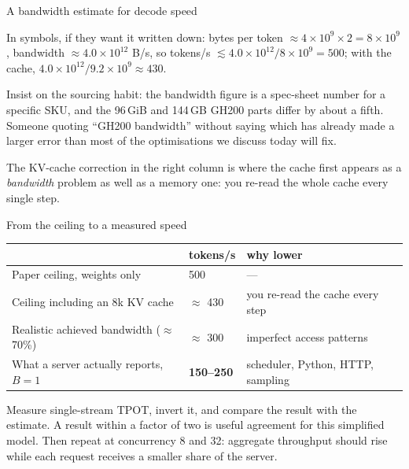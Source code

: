 \documentclass[aspectratio=169,10pt]{beamer}
\begin{document}
\begin{frame}{A bandwidth estimate for decode speed}
{  In symbols, if they want it written down: bytes per token
  $\approx 4\times10^{9}\times 2 = 8\times10^{9}$, bandwidth
  $\approx 4.0\times10^{12}$ B/s, so tokens/s
  $\lesssim 4.0\times10^{12}/8\times10^{9} = 500$; with the cache,
  $4.0\times10^{12}/9.2\times10^{9} \approx 430$.

  Insist on the sourcing habit: the bandwidth figure is a spec-sheet number for
  a specific SKU, and the 96\,GiB and 144\,GB GH200 parts differ by about a
  fifth. Someone quoting ``GH200 bandwidth'' without saying which has already
  made a larger error than most of the optimisations we discuss today will fix.

  The KV-cache correction in the right column is where the cache first appears
  as a \emph{bandwidth} problem as well as a memory one: you re-read the whole
  cache every single step.}
\end{frame}

\begin{frame}{From the ceiling to a measured speed}
  \centering
  \begin{tabular}{@{}L{5.0cm} R{2.2cm} L{4.0cm}@{}}
    \toprule
    & \textbf{tokens/s} & \textbf{why lower}\\
    \midrule
    Paper ceiling, weights only & 500 & ---\\
    Ceiling including an 8k KV cache & $\approx$ 430 & you re-read the cache every step\\
    Realistic achieved bandwidth ($\approx$ 70\%) & $\approx$ 300 & imperfect access patterns\\
    What a server actually reports, $B=1$ & \textbf{150--250} & scheduler, Python, HTTP, sampling\\
    \bottomrule
  \end{tabular}

  \vspace{0.3em}
  \raggedright
  Measure single-stream TPOT, invert it, and compare the result with the
  estimate. A result within a factor of two is useful agreement for this
  simplified model. Then repeat at concurrency 8 and 32: aggregate throughput
  should rise while each request receives a smaller share of the server.
\end{frame}
\end{document}
